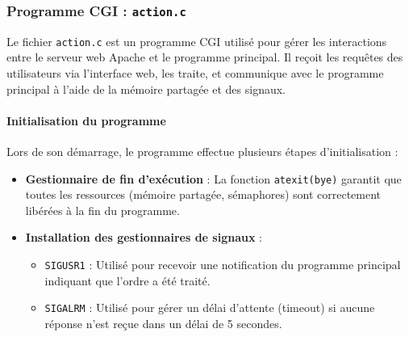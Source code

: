 \documentclass[a4paper, 11pt, french]{article}
\begin{document}
\subsubsection{Programme CGI : \texttt{action.c}} \label{sec:action.cgi}

Le fichier \texttt{action.c} est un programme CGI utilisé pour gérer les interactions entre le serveur web Apache et le programme principal. Il reçoit les requêtes des utilisateurs via l'interface web, les traite, et communique avec le programme principal à l'aide de la mémoire partagée et des signaux.


\paragraph{Initialisation du programme}
Lors de son démarrage, le programme effectue plusieurs étapes d'initialisation :
\begin{itemize}
    \item \textbf{Gestionnaire de fin d'exécution} : La fonction \texttt{atexit(bye)} garantit que toutes les ressources (mémoire partagée, sémaphores) sont correctement libérées à la fin du programme.
    \item \textbf{Installation des gestionnaires de signaux} :
    \begin{itemize}
        \item \texttt{SIGUSR1} : Utilisé pour recevoir une notification du programme principal indiquant que l'ordre a été traité.
        \item \texttt{SIGALRM} : Utilisé pour gérer un délai d'attente (timeout) si aucune réponse n'est reçue dans un délai de 5 secondes.
    \end{itemize}
\end{itemize}
\end{document}
